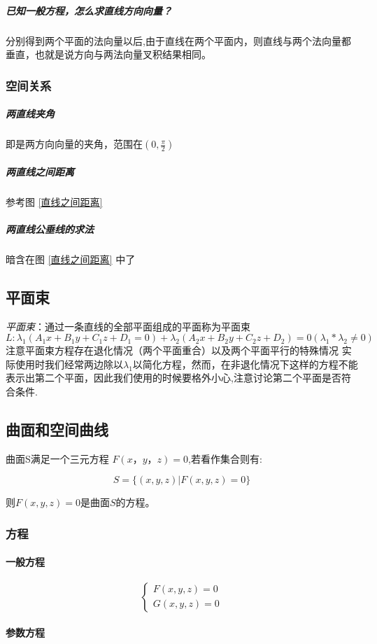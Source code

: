 \documentclass[UTF8]{ctexart}
\begin{document}
   \subparagraph{已知一般方程，怎么求直线方向向量？}
   分别得到两个平面的法向量以后,由于直线在两个平面内，则直线与两个法向量都垂直，也就是说方向与两法向量叉积结果相同。

\subsubsection{空间关系}
  \subparagraph{两直线夹角}即是两方向向量的夹角，范围在$(0,\frac \pi 2)$

  \subparagraph{两直线之间距离}参考图 \ref{直线之间距离}

  \subparagraph{两直线公垂线的求法}暗含在图 \ref{直线之间距离} 中了

\subsection{平面束}
\emph{平面束}：通过一条直线的全部平面组成的平面称为平面束
$$L:\lambda_1(A_1x+B_1y+C_1z+D_1=0) + \lambda_2(A_2x+B_2y+C_2z+D_2)=0 (\lambda_1 * \lambda_2 \ne 0)$$
注意平面束方程存在退化情况（两个平面重合）以及两个平面平行的特殊情况
实际使用时我们经常两边除以$\lambda_1$以简化方程，然而，在非退化情况下这样的方程不能表示出第二个平面，因此我们使用的时候要格外小心,注意讨论第二个平面是否符合条件.

\subsection{曲面和空间曲线}

曲面S满足一个三元方程 $F(x，y，z) = 0$,若看作集合则有:

$$S = \{(x,y,z)|F(x,y,z) = 0\}$$

则$F(x,y,z) = 0$是曲面$S$的方程。

\subsubsection{方程}

  \paragraph{一般方程}

    $$\begin{cases}F(x,y,z) = 0 \\G(x,y,z) = 0\end{cases}$$

  \paragraph{参数方程}
\end{document}
